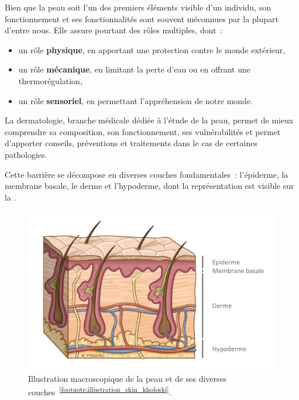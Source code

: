 Bien que la peau soit l'un des premiers éléments visible d'un individu, son fonctionnement et ses fonctionnalités sont souvent méconnues par la plupart d’entre nous. Elle assure pourtant des rôles multiples, dont~:
\begin{itemize}
    \item un rôle \textbf{physique}, en apportant une protection contre le monde extérieur,
    \item un rôle \textbf{mécanique}, en limitant la perte d’eau ou en offrant une thermorégulation,
    \item un rôle \textbf{sensoriel}, en permettant l'appréhension de notre monde.
\end{itemize}\par

La dermatologie, branche médicale dédiée à l’étude de la peau, permet de mieux comprendre sa composition, son fonctionnement, ses vulnérabilités et permet d’apporter conseils, préventions et traitements dans le cas de certaines pathologies.\par

Cette barrière se décompose en diverses couches fondamentales~: l’épiderme, la membrane basale, le derme et l’hypoderme, dont la représentation est visible sur la .\par
\begin{figure}[H]
    \centering
    \includegraphics[width=0.6\linewidth]{contents/chapter_1/resources/illustration_skin_kholoski.pdf}
    \caption{Illustration macroscopique de la peau et de ses diverses couches~\textsuperscript{\ref{footnote:illustration_skin_kholoski}}.}
    \label{fig:illustration_skin_kholoski}
\end{figure}\par 

\addtocounter{footnote}{1}

